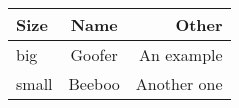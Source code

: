 \begin{tabular}{l | c | r }
Size & Name & Other\\ \hline
big & Goofer & An example\\ \hline
small & Beeboo & Another one\\ \hline
\end{tabular}